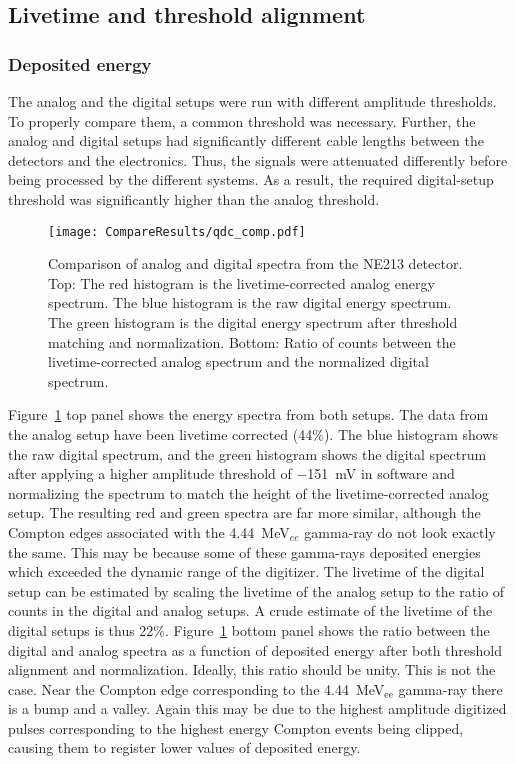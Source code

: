 \documentclass[main.tex]{subfiles}
\begin{document}
\subsection{Livetime and threshold alignment}
\subsubsection{Deposited energy}
The analog and the digital setups were run with different amplitude thresholds. To properly compare them, a common threshold was necessary. Further, the analog and digital setups had significantly different cable lengths between the detectors and the electronics. Thus, the signals were attenuated differently before being processed by the different systems. As a result, the required digital-setup threshold was significantly higher than the analog threshold.

\begin{figure}[h!]
    \centering
        \texttt{[image: CompareResults/qdc\_comp.pdf]}
        \caption[Comparison of analog and digital spectra from the NE213 detector.]{Comparison of analog and digital spectra from the NE213 detector. Top: The red histogram is the livetime-corrected analog energy spectrum. The blue histogram is the raw digital energy spectrum. The green histogram is the digital energy spectrum after threshold matching and normalization. Bottom: Ratio of counts between the livetime-corrected analog spectrum and the normalized digital spectrum.}
    \label{fig:qdc_comp}
\end{figure}
Figure~\ref{fig:qdc_comp} top panel shows the energy spectra from both setups. The data from the analog setup have been livetime corrected (44\%). The blue histogram shows the raw digital spectrum, and the green histogram shows the digital spectrum after applying a higher amplitude threshold of \SI{-151}{mV} in software and normalizing the spectrum to match the height of the livetime-corrected analog setup. The resulting red and green spectra are far more similar, although the Compton edges associated with the \SI{4.44}{\MeV}$_{ee}$ gamma-ray do not look exactly the same. This may be because some of these gamma-rays deposited energies which exceeded the dynamic range of the digitizer. 
The livetime of the digital setup can be estimated by scaling the livetime of the analog setup to the ratio of counts in the digital and analog setups. A crude estimate of the livetime of the digital setups is thus 22\%.
Figure~\ref{fig:qdc_comp} bottom panel shows the ratio between the digital and analog spectra as a function of deposited energy after both threshold alignment and normalization. Ideally, this ratio should be unity. This is not the case. Near the Compton edge corresponding to the \SI{4.44}{\MeV}$_\text{ee}$ gamma-ray there is a bump and a valley. Again this may be due to the highest amplitude digitized pulses corresponding to the highest energy Compton events being clipped, causing them to register lower values of deposited energy.
\end{document}
